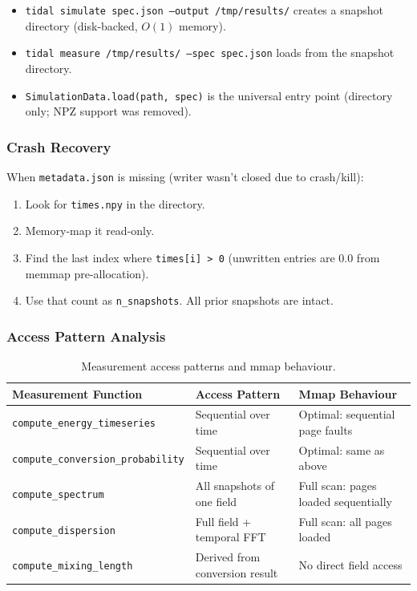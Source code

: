 \begin{itemize}
  \item \texttt{tidal simulate spec.json --output /tmp/results/} creates a snapshot directory (disk-backed, $O(1)$ memory).
  \item \texttt{tidal measure /tmp/results/ --spec spec.json} loads from the snapshot directory.
  \item \texttt{SimulationData.load(path, spec)} is the universal entry point (directory only; NPZ support was removed).
\end{itemize}

\subsubsection{Crash Recovery}

When \texttt{metadata.json} is missing (writer wasn't closed due to crash/kill):

\begin{enumerate}
  \item Look for \texttt{times.npy} in the directory.
  \item Memory-map it read-only.
  \item Find the last index where \texttt{times[i] > 0} (unwritten entries are 0.0 from memmap pre-allocation).
  \item Use that count as \texttt{n\_snapshots}. All prior snapshots are intact.
\end{enumerate}

\subsubsection{Access Pattern Analysis}

\begin{table}[htbp]
\centering
\caption{Measurement access patterns and mmap behaviour.}
\label{tab:adr-access}
\begin{tabular}{@{}lll@{}}
\toprule
Measurement Function & Access Pattern & Mmap Behaviour \\
\midrule
\texttt{compute\_energy\_timeseries} & Sequential over time & Optimal: sequential page faults \\
\texttt{compute\_conversion\_probability} & Sequential over time & Optimal: same as above \\
\texttt{compute\_spectrum} & All snapshots of one field & Full scan: pages loaded sequentially \\
\texttt{compute\_dispersion} & Full field + temporal FFT & Full scan: all pages loaded \\
\texttt{compute\_mixing\_length} & Derived from conversion result & No direct field access \\
\bottomrule
\end{tabular}
\end{table}

